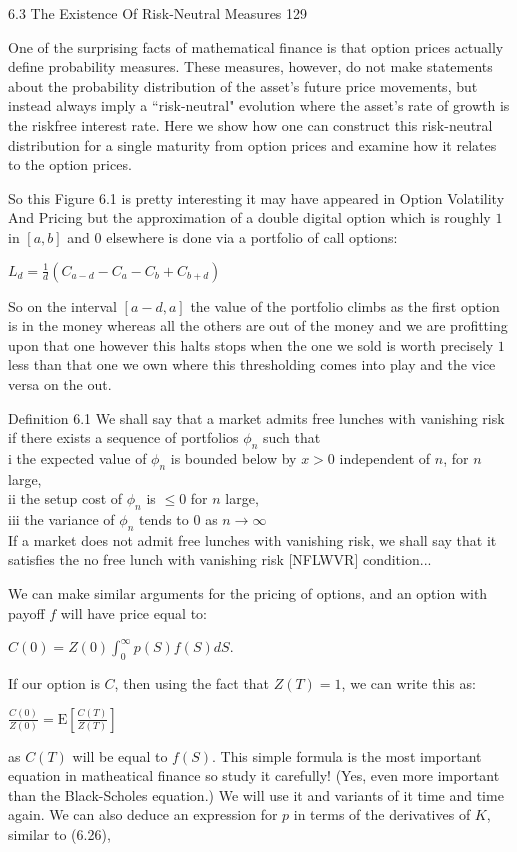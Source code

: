 6.3 The Existence Of Risk-Neutral Measures 129

One of the surprising facts of mathematical finance is that option prices actually define probability measures. These measures, however, do not make statements about the probability distribution of the asset's future price movements, but instead always imply a ``risk-neutral" evolution where the asset's rate of growth is the riskfree interest rate. Here we show how one can construct this risk-neutral distribution for a single maturity from option prices and examine how it relates to the option prices.

So this Figure 6.1 is pretty interesting it may have appeared in Option Volatility And Pricing but the approximation of a double digital option which is roughly $1$ in $[a,b]$ and $0$ elsewhere is done via a portfolio of call options:

$L_d = \frac{1}{d} (C_{a-d} - C_a - C_b + C_{b+d})$

So on the interval $[a-d,a]$ the value of the portfolio climbs as the first option is in the money whereas all the others are out of the money and we are profitting upon that one however this halts stops when the one we sold is worth precisely $1$ less than that one we own where this thresholding comes into play and the vice versa on the out.

Definition 6.1 We shall say that a market admits free lunches with vanishing risk if there exists a sequence of portfolios $\phi_n$ such that \\
i the expected value of $\phi_n$ is bounded below by $x>0$ independent of $n$, for $n$ large, \\
ii the setup cost of $\phi_n$ is $\le 0$ for $n$ large, \\
iii the variance of $\phi_n$ tends to $0$ as $n \to \infty$ \\
If a market does not admit free lunches with vanishing risk, we shall say that it satisfies the no free lunch with vanishing risk [NFLWVR] condition...

We can make similar arguments for the pricing of options, and an option with payoff $f$ will have price equal to:

$C(0) = Z(0) \int_0^{\infty} p(S) f(S) dS$.

If our option is $C$, then using the fact that $Z(T)=1$, we can write this as:

$\frac{C(0)}{Z(0)} = \text{E} \left[ \frac{C(T)}{Z(T)} \right]$

as $C(T)$ will be equal to $f(S)$. This simple formula is the most important equation in matheatical finance so study it carefully! (Yes, even more important than the Black-Scholes equation.) We will use it and variants of it time and time again. We can also deduce an expression for $p$ in terms of the derivatives of $K$, similar to (6.26),

